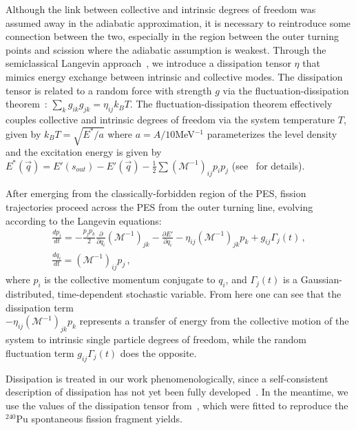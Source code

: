 Although the link between collective and intrinsic degrees of freedom was assumed away in the adiabatic approximation, it is necessary to reintroduce some connection between the two, especially in the region between the outer turning points and scission where the adiabatic assumption is weakest. Through the semiclassical Langevin approach~\cite{Kubo1966}, we introduce a dissipation tensor $\eta$ that mimics energy exchange between intrinsic and collective modes. The dissipation tensor is related to a random force with strength $g$ via the fluctuation-dissipation theorem~\cite{Callen1951,Kubo1966}: $\sum_k g_{ik}g_{jk} = \eta_{ij}k_BT$. The fluctuation-dissipation theorem effectively couples collective and intrinsic degrees of freedom via the system temperature $T$, given by $k_BT = \sqrt{E^*/a}$ where $a=A/10$MeV$^{-1}$ parameterizes the level density and the excitation energy is given by $E^*(\vec{q}) = E'(s_{out}) - E'(\vec{q}) - \frac{1}{2}\sum\left(\mathcal{M}^{-1}\right)_{ij}p_i p_j$ (see~\cite{Abe1996,Frobrich1998,Sadhukhan2016} for details).

After emerging from the classically-forbidden region of the PES, fission trajectories proceed across the PES from the outer turning line, evolving according to the Langevin equations:
\begin{gather}\label{eq:langevin} 
	\frac{dp_i}{dt} =  
	-\frac{p_j p_k}{2} \frac{\partial}{\partial q_i}\left(\mathcal{M}^{-1}\right)_{jk} 
	- \frac{\partial E'}{\partial q_i}  - \eta_{ij}\left(\mathcal{M}^{-1}\right)_{jk} p_k + g_{ij}\Gamma_j(t) \,, \\ 
	\frac{dq_i}{dt} = 	\left(\mathcal{M}^{-1}\right)_{ij} p_j \,,  
\end{gather} 
\noindent where $p_i$ is the collective momentum conjugate to $q_i$, and $\Gamma_j(t)$ is a Gaussian-distributed, time-dependent stochastic variable. From here one can see that the dissipation term\\\noindent $- \eta_{ij}\left(\mathcal{M}^{-1}\right)_{jk} p_k$ represents a transfer of energy from the collective motion of the system to intrinsic single particle degrees of freedom, while the random fluctuation term $g_{ij}\Gamma_j(t)$ does the opposite.

Dissipation is treated in our work phenomenologically, since a self-consistent description of dissipation has not yet been fully developed~\cite{Bulgac2018a}.  In the meantime, we use the values of the dissipation tensor from~\cite{Sadhukhan2016}, which were fitted to reproduce the $^{240}$Pu spontaneous fission fragment yields.%

